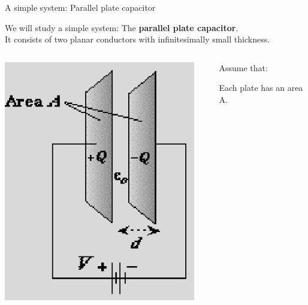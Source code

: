 %
%
%

\begin{frame}{A simple system: Parallel plate capacitor}

We will study a simple system: The {\bf parallel plate capacitor}.\\
It consists of two planar conductors with infinitesimally small thickness.\\

\vspace{0.2cm}

\begin{columns}
  \begin{column}{0.40\textwidth}
   \begin{center}
     \includegraphics[width=0.94\textwidth]{./images/schematics/parallel_plate_capacitor.png}\\
   \end{center}
  \end{column}
  \begin{column}{0.60\textwidth}
  {\small
    Assume that:
    \begin{itemize}
    {\small
       \item Each plate has an area A.
}
\end{itemize}}
\end{column}
\end{columns}
\end{frame}
